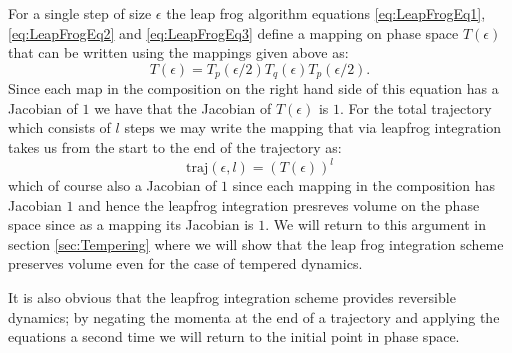 \documentclass[12pt]{article}
\begin{document}
            For a single step of size $\epsilon$ the leap frog algorithm equations \ref{eq:LeapFrogEq1}, \ref{eq:LeapFrogEq2} and \ref{eq:LeapFrogEq3} define a mapping on phase space $T\left(\epsilon\right)$ that can be written using the mappings given above as:
            \begin{equation}
                T\left(\epsilon\right)=T_p\left(\epsilon/2\right)T_q\left(\epsilon\right)T_p\left(\epsilon/2\right).
            \end{equation}
            Since each map in the composition on the right hand side of this equation has a Jacobian of $1$ we have that the Jacobian of $T\left(\epsilon\right)$ is $1$. For the total trajectory which consists of $l$ steps we may write the mapping that via leapfrog integration takes us from the start to the end of the trajectory as:
            \begin{equation}
                \text{traj}\left(\epsilon,l\right) = \left(T\left(\epsilon\right)\right)^l
            \end{equation}
            which of course also a Jacobian of $1$ since each mapping in the composition has Jacobian $1$ and hence the leapfrog integration presreves volume on the phase space since as a mapping its Jacobian is $1$. We will return to this argument in section \ref{sec:Tempering} where we will show that the leap frog integration scheme preserves volume even for the case of tempered dynamics. 
            
            It is also obvious that the leapfrog integration scheme provides reversible dynamics; by negating the momenta at the end of a trajectory and applying the equations a second time we will return to the initial point in phase space. 



        
\end{document}
